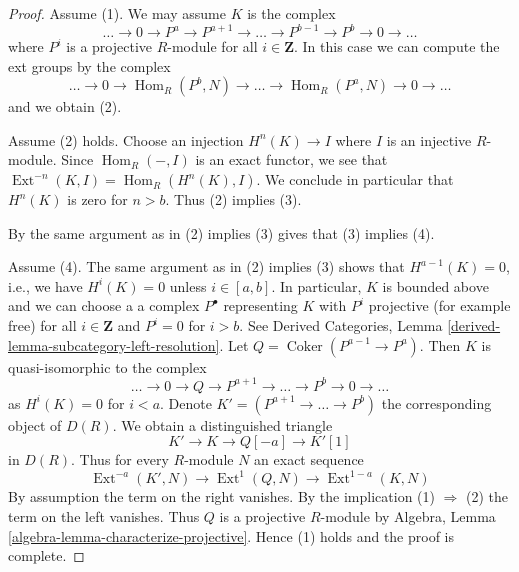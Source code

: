\documentclass[10pt,a4paper]{amsart}
\theoremstyle{plain}
\theoremstyle{definition}
\theoremstyle{remark}
\numberwithin{equation}{subsection}
\def\Hom{\mathop{\mathrm{Hom}}\nolimits}
\def\Ext{\mathop{\mathrm{Ext}}\nolimits}
\def\Coker{\mathop{\mathrm{Coker}}}
\begin{document}
\begin{proof}
Assume (1). We may assume $K$ is the complex
$$
\ldots \to 0 \to P^a \to P^{a + 1} \to \ldots \to
P^{b - 1} \to P^b \to 0 \to \ldots
$$
where $P^i$ is a projective $R$-module for all $i \in \mathbf{Z}$.
In this case we can compute the ext groups by the complex
$$
\ldots \to 0 \to \Hom_R(P^b, N) \to \ldots \to
\Hom_R(P^a, N) \to 0 \to \ldots
$$
and we obtain (2).

\medskip\noindent
Assume (2) holds. Choose an injection $H^n(K) \to I$ where $I$
is an injective $R$-module. Since $\Hom_R(-, I)$ is an exact functor,
we see that $\Ext^{-n}(K, I) = \Hom_R(H^n(K), I)$.
We conclude in particular that $H^n(K)$ is zero for $n > b$.
Thus (2) implies (3).

\medskip\noindent
By the same argument as in (2) implies (3) gives that (3) implies (4).

\medskip\noindent
Assume (4). The same argument as in (2) implies (3) shows that
$H^{a - 1}(K) = 0$, i.e., we have $H^i(K) = 0$ unless $i \in [a, b]$.
In particular, $K$ is bounded above and we can choose a
a complex $P^\bullet$ representing $K$ with $P^i$ projective
(for example free) for all $i \in \mathbf{Z}$ and $P^i = 0$ for $i > b$.
See Derived Categories, Lemma
\ref{derived-lemma-subcategory-left-resolution}.
Let $Q = \Coker(P^{a - 1} \to P^a)$. Then $K$ is quasi-isomorphic
to the complex
$$
\ldots \to 0 \to Q \to P^{a + 1} \to \ldots \to P^b \to 0 \to \ldots
$$
as $H^i(K) = 0$ for $i < a$.
Denote $K' = (P^{a + 1} \to \ldots \to P^b)$ the corresponding object of
$D(R)$. We obtain a distinguished triangle
$$
K' \to K \to Q[-a] \to K'[1]
$$
in $D(R)$. Thus for every $R$-module $N$ an exact sequence
$$
\Ext^{-a}(K', N) \to \Ext^1(Q, N) \to \Ext^{1 - a}(K, N)
$$
By assumption the term on the right vanishes. By the implication
(1) $\Rightarrow$ (2) the term on the left vanishes. Thus $Q$
is a projective $R$-module by
Algebra, Lemma \ref{algebra-lemma-characterize-projective}.
Hence (1) holds and the proof is complete.
\end{proof}
\end{document}
